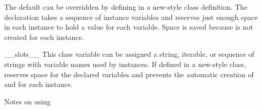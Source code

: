 The default can be overridden by defining  in a new-style class
definition.  The  declaration takes a sequence of instance
variables and reserves just enough space in each instance to hold a value
for each variable.  Space is saved because  is not created for
each instance.
    
\begin{datadesc}{__slots__}
This class variable can be assigned a string, iterable, or sequence of strings
with variable names used by instances.  If defined in a new-style class,
 reserves space for the declared variables
and prevents the automatic creation of  and 
for each instance.
\end{datadesc}

\noindent
Notes on using 

